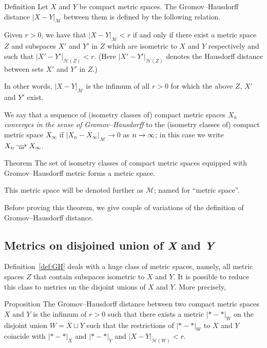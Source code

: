 \begin{thm}{Definition}\label{def:GH}
Let $X$ and $Y$ be compact metric spaces. 
The Gromov--Hausdorff distance $|X-Y|_{\mathcal{M}}$
between them is defined by the following
relation.
 
Given  $r > 0$, we have that $|X-Y|_{\mathcal{M}} < r$ if and only if there exist a metric
space $Z$ and subspaces $X'$ and $Y'$ in $Z$ which are isometric to $X$ and $Y$
respectively and such that $|X'-Y'|_{\mathcal{H}(Z)} < r$. 
(Here $|X'-Y'|_{\mathcal{H}(Z)}$ denotes the Hausdorff distance between sets $X'$ and $Y'$ in $Z$.)
\end{thm}

In other words, $|X-Y|_{\mathcal{M}}$ is
the infimum of all $r>0$ for which the above $Z$, $X'$ and $Y'$ exist. 


We say that a sequence
of (isometry classes of) compact metric spaces $X_n$ 
\emph{converges in the sense of Gromov--Hausdorff} to the (isometry classes of)
compact metric space $X_\infty$ if $|X_n - X_\infty|_{\mathcal{M}} \to 0$ as $n\z\to\infty$;
in this case we write $X_n\GHto X_\infty$.



\begin{thm}{Theorem}\label{thm:GH-is-a-metric}
The set of isometry classes of compact metric spaces equipped with Gromov--Hausdorff metric forms a metric space.

This metric space will be denoted further as $\mathcal{M}$; named for ``metric space''.
\end{thm}

Before proving this theorem, we give couple of variations 
of the definition of Gromov--Hausdorff distance.

\subsection*{Metrics on disjoined union of \textit{X} and \textit{Y}}


Definition~\ref{def:GH} deals with a huge class of metric spaces,
namely, all metric spaces $Z$ that contain subspaces isometric to $X$ and $Y$.
It is possible to reduce this class to metrics on the disjoint unions of $X$ and $Y$. 
More precisely, 

\begin{thm}{Proposition}\label{prop:GH=X+Y}
The Gromov--Hausdorff distance between two compact metric spaces $X$
and $Y$ is the infimum of $r > 0$ such that there exists a metric
$|{*}-{*}|_W$ on the disjoint union $W=X\sqcup Y$ 
such that the restrictions of $|{*}-{*}|_W$ to $X$ and $Y$
coincide with $|{*}-{*}|_X$ and $|{*}-{*}|_Y$ 
and $|X-Y|_{\mathcal{H}(W)} < r$. 
\end{thm}


